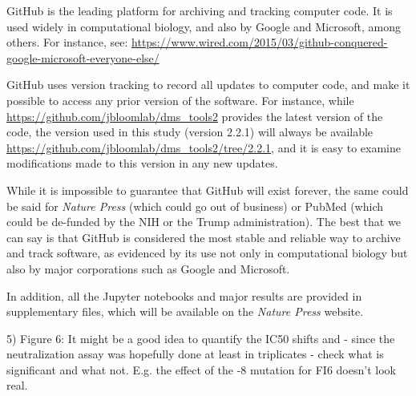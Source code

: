 \documentclass[11pt, oneside]{article}   	%
\begin{document}
{\color{black}
GitHub is the leading platform for archiving and tracking computer code.
It is used widely in computational biology, and also by Google and Microsoft, among others. For instance, see: \url{https://www.wired.com/2015/03/github-conquered-google-microsoft-everyone-else/}

GitHub uses version tracking to record all updates to computer code, and make it possible to access any prior version of the software.
For instance, while \url{https://github.com/jbloomlab/dms_tools2} provides the latest version of the code, the version used in this study (version 2.2.1) will always be available \url{https://github.com/jbloomlab/dms_tools2/tree/2.2.1}, and it is easy to examine modifications made to this version in any new updates.

While it is impossible to guarantee that GitHub will exist forever, the same could be said for \textit{Nature Press} (which could go out of business) or PubMed (which could be de-funded by the NIH or the Trump administration).
The best that we can say is that GitHub is considered the most stable and reliable way to archive and track software, as evidenced by its use not only in computational biology but also by major corporations such as Google and Microsoft.

In addition, all the Jupyter notebooks and major results are provided in supplementary files, which will be available on the \textit{Nature Press} website.
}

5) Figure 6: It might be a good idea to quantify the IC50 shifts and - since the neutralization assay was hopefully done at least in triplicates - check what is significant and what not. E.g. the effect of the -8 mutation for FI6 doesn't look real. 
\end{document}
